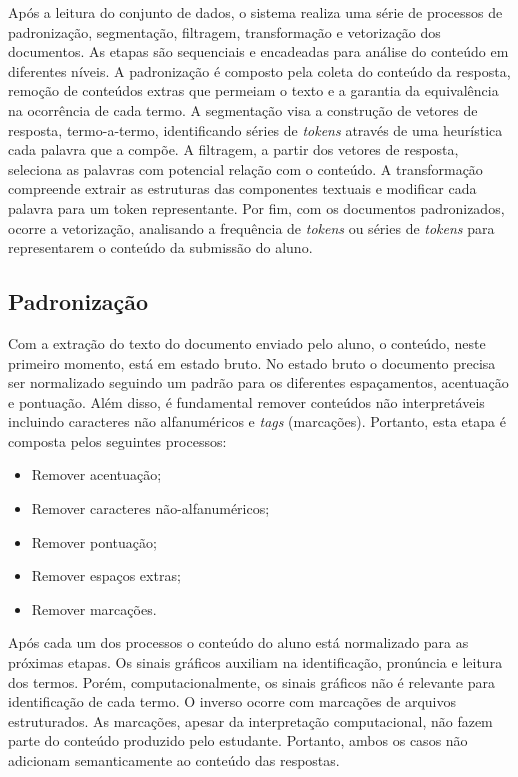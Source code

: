 Após a leitura do conjunto de dados, o sistema realiza uma série de processos de padronização, segmentação, filtragem, transformação e vetorização dos documentos. As etapas são sequenciais e encadeadas para análise do conteúdo em diferentes níveis. A padronização é composto pela coleta do conteúdo da resposta, remoção de conteúdos extras que permeiam o texto e a garantia da equivalência na ocorrência de cada termo. A segmentação visa a construção de vetores de resposta, termo-a-termo, identificando séries de \textit{tokens} através de uma heurística cada palavra que a compõe. A filtragem, a partir dos vetores de resposta, seleciona as palavras com potencial relação com o conteúdo. A transformação compreende extrair as estruturas das componentes textuais e modificar cada palavra para um token representante. Por fim, com os documentos padronizados, ocorre a vetorização, analisando a frequência de \textit{tokens} ou séries de \textit{tokens} para representarem o conteúdo da submissão do aluno.

\subsection{Padronização}
\label{subsec-padronizacao}
Com a extração do texto do documento enviado pelo aluno, o conteúdo, neste primeiro momento, está em estado bruto. No estado bruto o documento precisa ser normalizado seguindo um padrão para os diferentes espaçamentos, acentuação e pontuação. Além disso, é fundamental remover conteúdos não interpretáveis incluindo caracteres não alfanuméricos e \textit{tags} (marcações). Portanto, esta etapa é composta pelos seguintes processos:

\begin{itemize}
	\item Remover acentuação;
	\item Remover caracteres não-alfanuméricos;
	\item Remover pontuação;
	\item Remover espaços extras;
	\item Remover marcações.
\end{itemize}

Após cada um dos processos o conteúdo do aluno está normalizado para as próximas etapas. Os sinais gráficos auxiliam na identificação, pronúncia e leitura dos termos. Porém, computacionalmente, os sinais gráficos não é relevante para identificação de cada termo. O inverso ocorre com marcações de arquivos estruturados. As marcações, apesar da interpretação computacional, não fazem parte do conteúdo produzido pelo estudante. Portanto, ambos os casos não adicionam semanticamente ao conteúdo das respostas.

